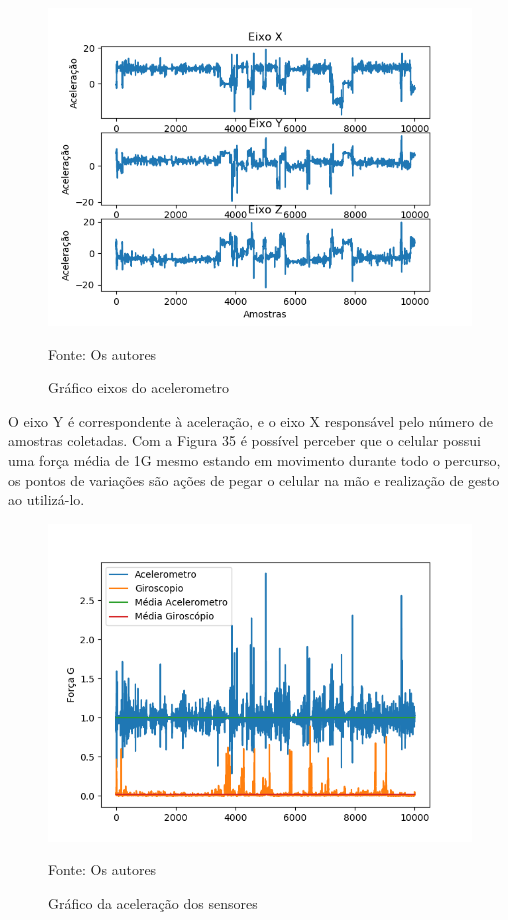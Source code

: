  \begin{figure}[H]

\begin{center}
     \caption{Gráfico eixos do acelerometro}
  \includegraphics[width=150mm]{images/Cap5/acelerao_3_eixos.png}
\end{center}
 \scriptsize Fonte: Os autores
  
\end{figure}



O eixo Y é correspondente à aceleração, e o eixo X responsável pelo número de amostras coletadas. Com a Figura 35 é possível perceber que o celular   possui uma força média de 1G mesmo estando em movimento durante  todo o percurso, os pontos de variações são ações de pegar o celular na mão e realização de gesto ao utilizá-lo.


 \begin{figure}[H]

\begin{center}
     \caption{Gráfico da aceleração dos sensores}
  \includegraphics[width=150mm]{images/Cap5/medias_.png}
\end{center}
 \scriptsize Fonte: Os autores
  
\end{figure}




